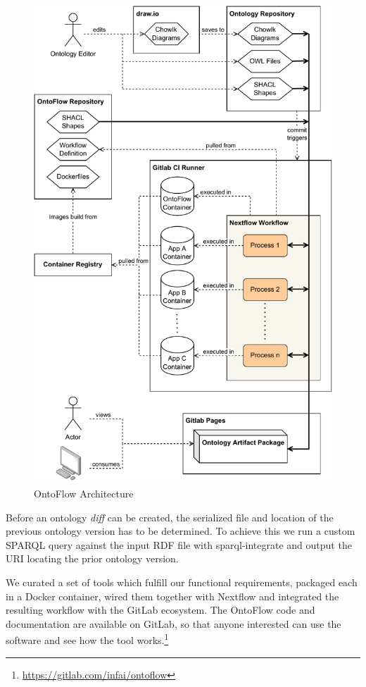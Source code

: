 \documentclass[runningheads]{llncs}
\begin{document}
\begin{figure}[htbp]
	\centering
	\includegraphics[width=.75\textwidth]{architecture.pdf}
	\caption{OntoFlow Architecture}
	\label{fig:architecture}
\end{figure}
Before an ontology \textit{diff} can be created, the serialized file and location of the previous ontology version has to be determined. To achieve this we run a custom SPARQL query against the input RDF file with sparql-integrate and output the URI locating the prior ontology version.

We curated a set of tools which fulfill our functional requirements, packaged each in a Docker container, wired them together with Nextflow and integrated the resulting workflow with the GitLab ecosystem.
The OntoFlow code and documentation are available on GitLab, so that anyone interested can use the software and see how the tool works.\footnote{\url{https://gitlab.com/infai/ontoflow}}
\end{document}
